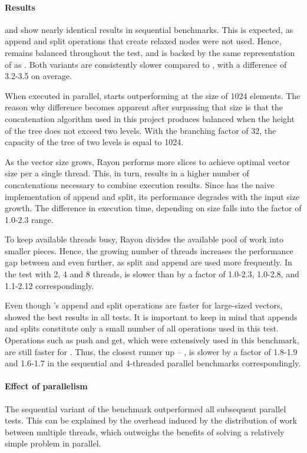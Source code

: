 \paragraph{Results}
\rbvec{} and \rrbvec{} show nearly identical results in sequential benchmarks. This is expected, as append and split operations that create relaxed nodes were not used. Hence, \rrbvec{} remains balanced throughout the test, and is backed by the same representation of \rrbtree{} as \rbvec{}. Both variants are consistently slower compared to \stdvec{}, with a difference of 3.2-3.5 on average.

When executed in parallel, \rrbvec{} starts outperforming \rbvec{} at the size of 1024 elements. The reason why difference becomes apparent after surpassing that size is that the concatenation algorithm used in this project produces balanced \rbtree{} when the height of the tree does not exceed two levels. With the branching factor of 32, the capacity of the tree of two levels is equal to 1024.

As the vector size grows, Rayon performs more slices to achieve optimal vector size per a single thread. This, in turn, results in a higher number of concatenations necessary to combine execution results. Since \rbvec{} has the naive implementation of append and split, its performance degrades with the input size growth. The difference in execution time, depending on size falls into the factor of 1.0-2.3 range.

To keep available threads busy, Rayon divides the available pool of work into smaller pieces. Hence, the growing number of threads increases the performance gap between \rbvec{} and \rrbvec{} even further, as split and append are used more frequently. In the test with 2, 4 and 8 threads, \rbvec{} is slower than \rrbvec{} by a factor of 1.0-2.3, 1.0-2.8, and 1.1-2.12 correspondingly.

Even though \rrbvec{}'s append and split operations are faster for large-sized vectors, \stdvec{} showed the best results in all tests. It is important to keep in mind that appends and splits constitute only a small number of all operations used in this test. Operations such as push and get, which were extensively used in this benchmark, are still faster for \stdvec{}. Thus, the closest runner up -- \pvec{}, is slower by a factor of 1.8-1.9 and 1.6-1.7 in the sequential and 4-threaded parallel benchmarks correspondingly.

\paragraph{Effect of parallelism}
The sequential variant of the benchmark outperformed all subsequent parallel tests. This can be explained by the overhead induced by the distribution of work between multiple threads, which outweighs the benefits of solving a relatively simple problem in parallel.

